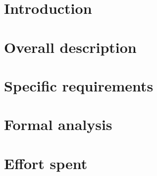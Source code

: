 \documentclass{article}
\begin{document}
\newpage

\tableofcontents

\newpage

\section{Introduction}


\newpage

\section{Overall description}


\newpage

\section{Specific requirements}



\newpage

\section{Formal analysis}

\newpage

\section{Effort spent}

\end{document}
